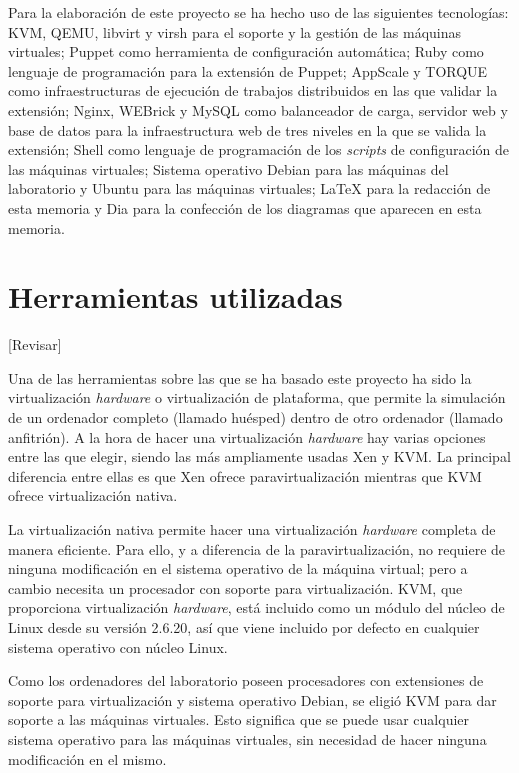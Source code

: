 Para la elaboración de este proyecto se ha hecho uso de las siguientes tecnologías: KVM, QEMU, libvirt y virsh para el soporte y la gestión de las máquinas virtuales; Puppet como herramienta de configuración automática; Ruby como lenguaje de programación para la extensión de Puppet; AppScale y TORQUE como infraestructuras de ejecución de trabajos distribuidos en las que validar la extensión; Nginx, WEBrick y MySQL como balanceador de carga, servidor web y base de datos para la infraestructura web de tres niveles en la que se valida la extensión; Shell como lenguaje de programación de los \emph{scripts} de configuración de las máquinas virtuales; Sistema operativo Debian para las máquinas del laboratorio y Ubuntu para las máquinas virtuales; \LaTeX{} \cite{manual:latex} para la redacción de esta memoria y Dia para la confección de los diagramas que aparecen en esta memoria.


\section{Herramientas utilizadas}

[Revisar]

Una de las herramientas sobre las que se ha basado este proyecto ha sido la virtualización \emph{hardware} o virtualización de plataforma, que permite la simulación de un ordenador completo (llamado huésped) dentro de otro ordenador (llamado anfitrión). A la hora de hacer una virtualización \emph{hardware} hay varias opciones entre las que elegir, siendo las más ampliamente usadas Xen y KVM. La principal diferencia entre ellas es que Xen ofrece paravirtualización mientras que KVM ofrece virtualización nativa.

La virtualización nativa permite hacer una virtualización \emph{hardware} completa de manera eficiente. Para ello, y a diferencia de la paravirtualización, no requiere de ninguna modificación en el sistema operativo de la máquina virtual; pero a cambio necesita un procesador con soporte para virtualización. KVM, que proporciona virtualización \emph{hardware}, está incluido como un módulo del núcleo de Linux desde su versión 2.6.20, así que viene incluido por defecto en cualquier sistema operativo con núcleo Linux.

Como los ordenadores del laboratorio poseen procesadores con extensiones de soporte para virtualización y sistema operativo Debian, se eligió KVM para dar soporte a las máquinas virtuales. Esto significa que se puede usar cualquier sistema operativo para las máquinas virtuales, sin necesidad de hacer ninguna modificación en el mismo.


